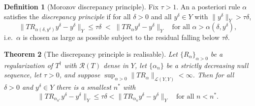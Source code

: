 \documentclass[a4paper]{report}
\theoremstyle{plain}
\newtheorem{theorem}{Theorem}[chapter]
\theoremstyle{definition}
\newtheorem{definition}[theorem]{Definition}
\theoremstyle{remark}
\newcommand{\Ll}{\mathcal{L}}
\newcommand{\Ran}{\mathcal{R}}
\newcommand{\dg}{^{\dagger}}
\begin{document}
\begin{definition}[Morozov discrepancy principle]
  \label{def_discrepancy_principle}
  Fix $\tau > 1$.  An a posteriori rule $\alpha$ satisfies the \emph{discrepancy
  principle} if for all $\delta > 0$ and all $y^{\delta} \in Y$ with
  $\|y^{\delta}\|_Y > \tau\delta$,
  \[
    \bigl\| T R_{\alpha(\delta,y^{\delta})} y^{\delta} - y^{\delta} \bigr\|_Y \le \tau\delta
    \;<\; \bigl\| T R_{\alpha} y^{\delta} - y^{\delta} \bigr\|_Y
    \quad\text{for all } \alpha > \alpha(\delta,y^{\delta}) ,
  \]
  i.e.\ $\alpha$ is chosen as large as possible subject to the residual falling below
  $\tau\delta$.
\end{definition}


\begin{theorem}[The discrepancy principle is realisable]
  \label{thm_discrepancy_well_defined}
  Let $\{R_{\alpha}\}_{\alpha>0}$ be a regularization of $T\dg$ with $\Ran(T)$ dense in
  $Y$, let $\{\alpha_n\}$ be a strictly decreasing null sequence, let $\tau > 0$, and
  suppose $\sup_{\alpha>0}\|TR_{\alpha}\|_{\Ll(Y,Y)} < \infty$.  Then for all
  $\delta > 0$ and $y^{\delta} \in Y$ there is a smallest $n^{*}$ with
  \[
    \|TR_{\alpha_{n^{*}}} y^{\delta} - y^{\delta}\|_Y \le \tau\delta
    < \|TR_{\alpha_n} y^{\delta} - y^{\delta}\|_Y \quad\text{for all } n < n^{*} .
  \]
\end{theorem}
\end{document}
